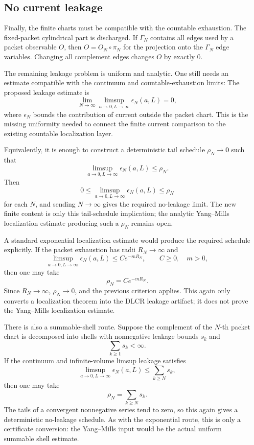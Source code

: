 \subsection{No current leakage}
Finally, the finite charts must be compatible with the countable exhaustion.
The fixed-packet cylindrical part is discharged. If $\Gamma_N$ contains all
edges used by a packet observable $O$, then $O=O_N\circ\pi_N$ for the projection
onto the $\Gamma_N$ edge variables. Changing all complement edges changes $O$ by
exactly $0$.

The remaining leakage problem is uniform and analytic. One still needs an
estimate compatible with the continuum and countable-exhaustion limits:
The proposed leakage estimate is
\[
  \lim_{N\to\infty}\limsup_{a\to0,L\to\infty}\epsilon_N(a,L)=0,
\]
where $\epsilon_N$ bounds the contribution of current outside the packet chart.
This is the missing uniformity needed to connect the finite current comparison
to the existing countable localization layer.

Equivalently, it is enough to construct a deterministic tail schedule
$\rho_N\to0$ such that
\[
  \limsup_{a\to0,L\to\infty}\epsilon_N(a,L)\leq\rho_N .
\]
Then
\[
  0\leq
  \limsup_{a\to0,L\to\infty}\epsilon_N(a,L)
  \leq\rho_N
\]
for each $N$, and sending $N\to\infty$ gives the required no-leakage limit. The
new finite content is only this tail-schedule implication; the analytic
Yang--Mills localization estimate producing such a $\rho_N$ remains open.

A standard exponential localization estimate would produce the required
schedule explicitly. If the packet exhaustion has radii $R_N\to\infty$ and
\[
  \limsup_{a\to0,L\to\infty}\epsilon_N(a,L)
  \leq
  C e^{-mR_N},
  \qquad C\geq0,\quad m>0,
\]
then one may take
\[
  \rho_N=C e^{-mR_N}.
\]
Since $R_N\to\infty$, $\rho_N\to0$, and the previous criterion applies. This
again only converts a localization theorem into the DLCR leakage artifact; it
does not prove the Yang--Mills localization estimate.

There is also a summable-shell route. Suppose the complement of the $N$-th
packet chart is decomposed into shells with nonnegative leakage bounds $s_k$
and
\[
  \sum_{k\geq1}s_k<\infty .
\]
If the continuum and infinite-volume limsup leakage satisfies
\[
  \limsup_{a\to0,L\to\infty}\epsilon_N(a,L)
  \leq
  \sum_{k\geq N}s_k ,
\]
then one may take
\[
  \rho_N=\sum_{k\geq N}s_k .
\]
The tails of a convergent nonnegative series tend to zero, so this again gives
a deterministic no-leakage schedule. As with the exponential route, this is
only a certificate conversion: the Yang--Mills input would be the actual
uniform summable shell estimate.

